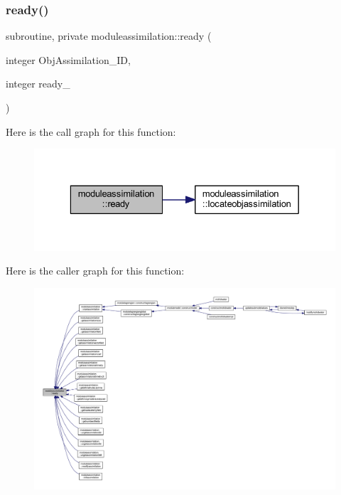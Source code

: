 \subsubsection{\texorpdfstring{ready()}{ready()}}
{\footnotesize\ttfamily subroutine, private moduleassimilation\+::ready (\begin{DoxyParamCaption}\item[{integer}]{Obj\+Assimilation\+\_\+\+ID,  }\item[{integer}]{ready\+\_\+ }\end{DoxyParamCaption})\hspace{0.3cm}{\ttfamily [private]}}

Here is the call graph for this function\+:\nopagebreak
\begin{figure}[H]
\begin{center}
\leavevmode
\includegraphics[width=329pt]{namespacemoduleassimilation_a7c7eb17646a26837c5dfb9acc963b010_cgraph}
\end{center}
\end{figure}
Here is the caller graph for this function\+:\nopagebreak
\begin{figure}[H]
\begin{center}
\leavevmode
\includegraphics[width=350pt]{namespacemoduleassimilation_a7c7eb17646a26837c5dfb9acc963b010_icgraph}
\end{center}
\end{figure}
\mbox{\label{namespacemoduleassimilation_a91d65081df0418d8a1b46cb4548710f3}} 
